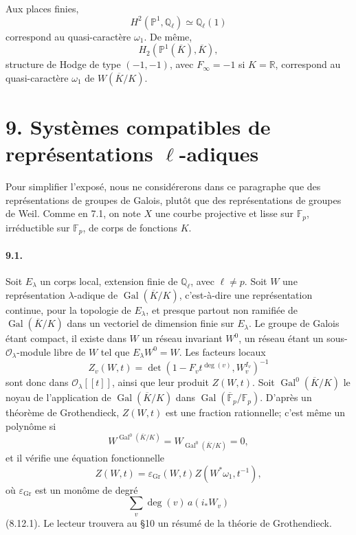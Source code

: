 \documentclass[10pt]{article}
\newcommand{\Q}{\mathbb Q}
\newcommand{\F}{\mathbb F}
\newcommand{\Gal}{\operatorname{Gal}}
\providecommand{\R}{\mathbb R}
\providecommand{\Gal}{\operatorname{Gal}}
\providecommand{\Gal}{\operatorname{Gal}}
\providecommand{\Gal}{\operatorname{Gal}}
\providecommand{\Gal}{\operatorname{Gal}}
\begin{document}
Aux places finies,
\[
H^2(\mathbb P^1,\Q_\ell)\simeq\Q_\ell(1)
\]
correspond au quasi-caractère $\omega_1$. De même,
\[
H_2(\mathbb P^1(\overline K),\overline K),
\]
structure de Hodge de type $(-1,-1)$, avec $F_\infty=-1$ si $K=\R$, correspond au quasi-caractère $\omega_1$ de $W(\overline K/K)$.

\section*{9. Systèmes compatibles de représentations $\ell$-adiques}

Pour simplifier l'exposé, nous ne considérerons dans ce paragraphe que des représentations de groupes de Galois, plutôt que des représentations de groupes de Weil. Comme en 7.1, on note $X$ une courbe projective et lisse sur $\F_p$, irréductible sur $\F_p$, de corps de fonctions $K$.

\paragraph{9.1.} Soit $E_\lambda$ un corps local, extension finie de $\Q_\ell$, avec $\ell\ne p$. Soit $W$ une représentation $\lambda$-adique de $\Gal(\overline K/K)$, c'est-à-dire une représentation continue, pour la topologie de $E_\lambda$, et presque partout non ramifiée de $\Gal(\overline K/K)$ dans un vectoriel de dimension finie sur $E_\lambda$. Le groupe de Galois étant compact, il existe dans $W$ un réseau invariant $W^0$, un réseau étant un sous-$\mathcal O_\lambda$-module libre de $W$ tel que $E_\lambda W^0=W$. Les facteurs locaux
\[
Z_v(W,t)=\det(1-F_vt^{\deg(v)},W_v^{I_v})^{-1}
\]
sont donc dans $\mathcal O_\lambda[[t]]$, ainsi que leur produit $Z(W,t)$. Soit $\Gal^0(\overline K/K)$ le noyau de l'application de $\Gal(\overline K/K)$ dans $\Gal(\overline{\F}_p/\F_p)$. D'après un théorème de Grothendieck, $Z(W,t)$ est une fraction rationnelle; c'est même un polynôme si
\[
W^{\Gal^0(\overline K/K)}=W_{\Gal^0(\overline K/K)}=0,
\]
et il vérifie une équation fonctionnelle
\[
\tag{9.1.1}
Z(W,t)=\varepsilon_{\mathrm{Gr}}(W,t)Z(W^*\omega_1,t^{-1}),
\]
où $\varepsilon_{\mathrm{Gr}}$ est un monôme de degré
\[
\sum_v\deg(v)\,a(i_*W_v)
\]
(8.12.1). Le lecteur trouvera au §10 un résumé de la théorie de Grothendieck.
\end{document}
